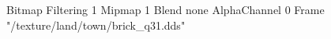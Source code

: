 {Bitmap
	{Filtering 1}
	{Mipmap 1}
	{Blend none}
	{AlphaChannel 0}
	{Frame "/texture/land/town/brick_q31.dds"}
}
